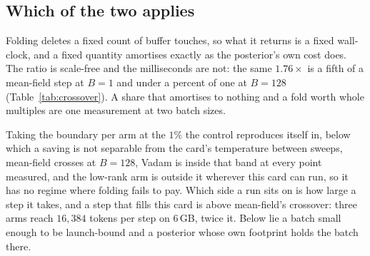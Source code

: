 \begin{table}[t]
  \centering
  \resizebox{\linewidth}{!}{}
  \caption{Parameter-sized work before and after folding, where both sweeps measured
  the point; the last column is the share after over the share before. The ensemble's
  code is identical in both, so its rows are the drift.}
  \label{tab:fusion}
\end{table}

\subsection{Which of the two applies}
\label{sec:cost:crossover}


Folding deletes a fixed count of buffer touches, so what it returns is a fixed
wall-clock, and a fixed quantity amortises exactly as the posterior's own cost does.
The ratio is scale-free and the milliseconds are not: the same $1.76\times$ is a fifth
of a mean-field step at $B = 1$ and under a percent of one at $B = 128$
(Table~\ref{tab:crossover}). A share that amortises to nothing and a fold worth whole
multiples are one measurement at two batch sizes.

Taking the boundary per arm at the $1\%$ the control reproduces itself in, below which
a saving is not separable from the card's temperature between sweeps,
mean-field crosses at $B = 128$, Vadam is inside that band at every point measured, and
the low-rank arm is outside it wherever this card can run, so it has no regime where
folding fails to pay. Which side a run sits on is how large a step it takes, and a step
that fills this card is above mean-field's crossover: three arms reach $16{,}384$ tokens
per step on $6$\,GB, twice it. Below lie a batch small enough to be launch-bound and a
posterior whose own footprint holds the batch there.

\begin{table}[t]
  \centering
  \resizebox{\linewidth}{!}{}
  \caption{Where folding stops being separable from drift. What it returns is $O(P)$
  time deleted, over the unfused step; $B^\ast$ is the first batch size measured at
  which that lands inside the control's band, or a bound where the sweep never reaches
  or never leaves it.}
  \label{tab:crossover}
\end{table}
